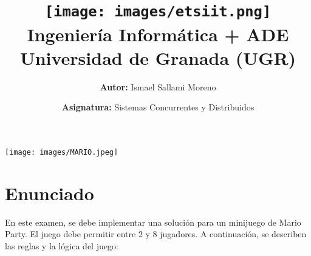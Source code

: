 \documentclass[a4paper,12pt]{article}
\title{
    \vspace{-2cm}
    \texttt{[image: images/etsiit.png]} \\ %
    \LARGE Ingeniería Informática + ADE\\
    \large Universidad de Granada (UGR)\\[1cm]
}
\author{\textbf{Autor:} Ismael Sallami Moreno}
\date{\textbf{Asignatura:} Sistemas Concurrentes y Distribuidos}
\begin{document}
\maketitle
\thispagestyle{empty}

\begin{center}
    \texttt{[image: images/MARIO.jpeg]} \\ %
    \vfill
\end{center}

\newpage

\tableofcontents
\newpage

\section{Enunciado}
En este examen, se debe implementar una solución para un minijuego de Mario Party. El juego debe permitir entre 2 y 8 jugadores. A continuación, se describen las reglas y la lógica del juego:
\end{document}
